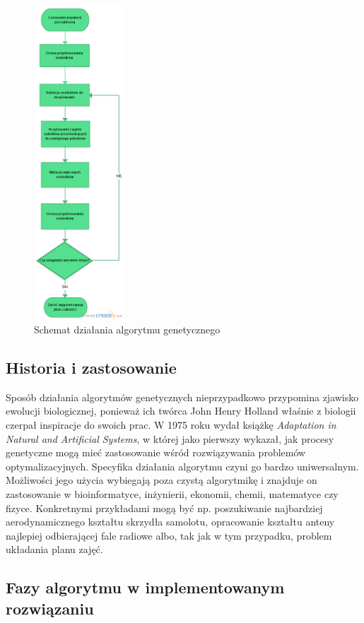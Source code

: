 \begin{figure}[H]
  \caption{Schemat działania algorytmu genetycznego}
  \centering
    \includegraphics[width=0.3\textwidth]{img/schematGA.png}
\end{figure}
\subsection{Historia i zastosowanie}
Sposób działania algorytmów genetycznych nieprzypadkowo przypomina zjawisko ewolucji biologicznej, ponieważ ich twórca John Henry Holland właśnie z biologii czerpał inspiracje do swoich prac\cite{Mitchell}. W 1975 roku wydał książkę \emph{Adaptation in Natural and Artificial Systems}, w której jako pierwszy wykazał, jak procesy genetyczne mogą mieć zastosowanie wśród rozwiązywania problemów optymalizacyjnych. Specyfika działania algorytmu czyni go bardzo uniwersalnym. Możliwości jego użycia wybiegają poza czystą algorytmikę i znajduje on zastosowanie w bioinformatyce, inżynierii, ekonomii, chemii, matematyce czy fizyce. Konkretnymi przykładami mogą być np. poszukiwanie najbardziej aerodynamicznego kształtu skrzydła samolotu, opracowanie kształtu anteny najlepiej odbierającej fale radiowe albo, tak jak w tym przypadku, problem układania planu zajęć.
\subsection{Fazy algorytmu w implementowanym rozwiązaniu}
